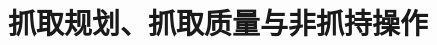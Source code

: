 \chapter{抓取规划、抓取质量与非抓持操作}
\label{ch:grasp-planning}


\providecommand{\rank}{\operatorname{rank}}
\providecommand{\pos}{\operatorname{pos}}      %
\providecommand{\conv}{\operatorname{conv}}    %
\providecommand{\spanop}{\operatorname{span}}  %
\providecommand{\interior}{\operatorname{int}} %
\providecommand{\trace}{\operatorname{tr}}
\providecommand{\diagop}{\operatorname{diag}}
\providecommand{\skewm}[1]{\widehat{#1}}

